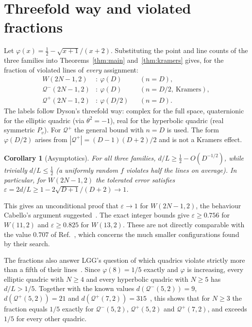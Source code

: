 \documentclass[aps,pra,onecolumn,11pt,superscriptaddress,nofootinbib]{revtex4-2}
\newtheorem{corollary}[theorem]{Corollary}
\theoremstyle{definition}
\theoremstyle{remark}
\newcommand{\Qp}{\mathcal{Q}^{+}}
\newcommand{\Qm}{\mathcal{Q}^{-}}
\begin{document}
\section{Threefold way and violated fractions}

Let $\varphi(x)=\tfrac12-\sqrt{x+1}/(x+2)$. Substituting the point and line counts of the three
families into Theorems~\ref{thm:main} and~\ref{thm:kramers} gives, for the fraction of
violated lines of \emph{every} assignment:
\begin{align}
  W(2N-1,2)&:\ \varphi(D) && (n=D),\\
  \Qm(2N-1,2)&:\ \varphi(D) && (n=D/2,\ \text{Kramers}),\\
  \Qp(2N-1,2)&:\ \varphi(D/2) && (n=D).
\end{align}
The labels follow Dyson's threefold way: complex for the full space, quaternionic for the
elliptic quadric (via $\theta^2=-1$), real for the hyperbolic quadric (real symmetric
$P_v$). For $\Qp$ the general bound with $n=D$ is used. The form $\varphi(D/2)$ arises from
$|\Qp|=(D-1)(D+2)/2$ and is not a Kramers effect.

\begin{corollary}[Asymptotics]\label{cor:asym}
For all three families, $d/L\ge\tfrac12-O(D^{-1/2})$, while trivially $d/L\le\tfrac12$
(a uniformly random $f$ violates half the lines on average). In particular, for $W(2N-1,2)$
the tolerated error satisfies $\varepsilon=2d/L\ge 1-2\sqrt{D+1}/(D+2)\to1$.
\end{corollary}

This gives an unconditional proof that $\varepsilon\to1$ for $W(2N-1,2)$, the behaviour
Cabello's argument suggested~\cite{Cabello2010}. The exact integer bounds give
$\varepsilon\ge0.756$ for $W(11,2)$ and $\varepsilon\ge0.825$ for $W(13,2)$. These are not
directly comparable with the value $0.707$ of Ref.~\cite{MullerSaniga2026}, which concerns
the much smaller configurations found by their search.

The fractions also answer LGG's question of which quadrics violate strictly more than a fifth
of their lines~\cite{LGG2026}. Since $\varphi(8)=1/5$ exactly and $\varphi$ is increasing, every
elliptic quadric with $N\ge4$ and every hyperbolic quadric with $N\ge5$ has $d/L>1/5$. Together
with the known values $d(\Qm(5,2))=9$, $d(\Qp(5,2))=21$ and
$d(\Qp(7,2))=315$~\cite{deBoutray2022,LGG2026}, this shows that for $N\ge3$ the fraction
equals $1/5$ exactly for $\Qm(5,2)$, $\Qp(5,2)$ and $\Qp(7,2)$, and exceeds $1/5$ for every
other quadric.
\end{document}
